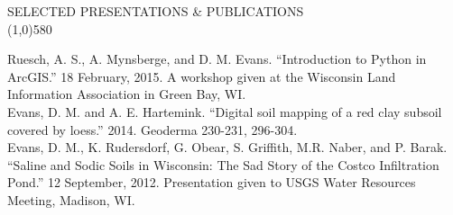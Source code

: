 \documentclass{article}
\begin{document}
\noindent \large{SELECTED PRESENTATIONS \& PUBLICATIONS}\\ 
\line(1,0){580}\\

\begin{small}
\leftskip 0.1in
\parindent -0.1in
Ruesch, A. S., A. Mynsberge, and D. M. Evans. ``Introduction to Python in ArcGIS.'' 18 February, 2015. A workshop given at the Wisconsin Land Information Association in Green Bay, WI.\\

Evans, D. M. and A. E. Hartemink. ``Digital soil mapping of a red clay subsoil covered by loess.'' 2014. Geoderma 230-231, 296-304.\\

Evans, D. M., K. Rudersdorf, G. Obear, S. Griffith, M.R. Naber, and P. Barak. ``Saline and Sodic Soils in Wisconsin: The Sad Story of the Costco Infiltration Pond.'' 12 September, 2012. Presentation given to USGS Water Resources Meeting, Madison, WI.\\


\end{small}
\end{document}
